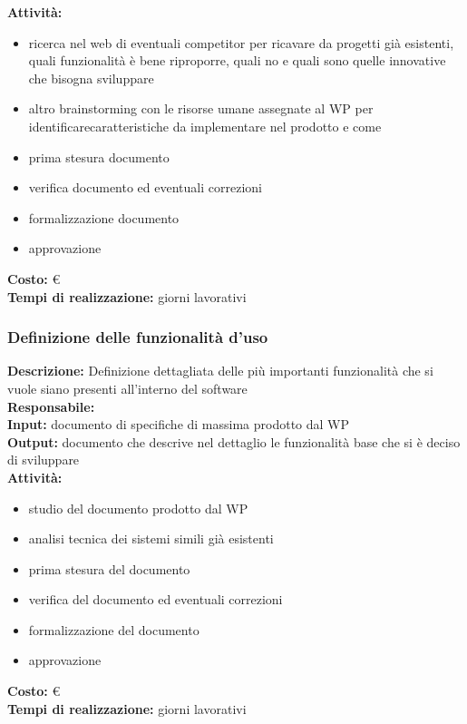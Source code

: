 \textbf{Attività:}
\begin{itemize}
\item ricerca nel web di eventuali competitor per ricavare da progetti già esistenti, quali
funzionalità è bene riproporre, quali no e quali sono quelle innovative che bisogna
sviluppare
\item altro brainstorming con le risorse umane assegnate al WP per identificarecaratteristiche da implementare nel prodotto e come
\item prima stesura documento
\item verifica documento ed eventuali correzioni
\item formalizzazione documento
\item approvazione
\end{itemize}
\textbf{Costo:} \euro \\
\textbf{Tempi di realizzazione:} giorni lavorativi


\subsubsection{Definizione delle funzionalità d'uso}

\textbf{Descrizione:} Definizione dettagliata delle più importanti funzionalità che si vuole siano presenti all'interno del software\\
\linebreak
\textbf{Responsabile:} \\
\linebreak
\textbf{Input:} documento di specifiche di massima prodotto dal WP \\
\linebreak
\textbf{Output:} documento che descrive nel dettaglio le funzionalità base che si è deciso di sviluppare \\
\linebreak
\textbf{Attività:}
\begin{itemize}
\item studio del documento prodotto dal WP
\item analisi tecnica dei sistemi simili già esistenti
\item prima stesura del documento
\item verifica del documento ed eventuali correzioni
\item formalizzazione del documento
\item approvazione
\end{itemize}

\textbf{Costo:}  \euro \\
\textbf{Tempi di realizzazione:}  giorni lavorativi\\


